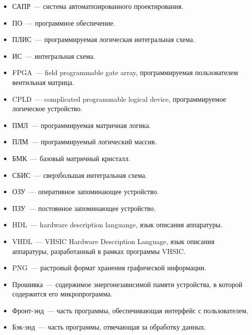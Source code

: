 \begin{itemize}[label=]
  \item САПР~--- система автоматизированного проектирования.
  \item ПО~--- программное обеспечение.
  \item ПЛИС~--- программируемая логическая интегральная схема.
  \item ИС~--- интегральная схема.
  \item FPGA~--- field programmable gate array, программируемая пользователем вентильная матрица.
  \item CPLD~--- complicated programmable logical device, программируемое логическое устройство.
  \item ПМЛ~--- программируемая матричная логика.
  \item ПЛМ~--- программируемый логический массив.
  \item БМК~--- базовый матричный кристалл.
  \item СБИС~--- сверхбольшая интегральная схема.
  \item ОЗУ~--- оперативное запоминающее устройство.
  \item ПЗУ~--- постоянное запоминающее устройство.
  \item HDL~--- hardware description languange, язык описания аппаратуры.
  \item VHDL~--- VHSIC Hardware Description Language, язык описания аппаратуры, разработанный в рамках программы VHSIC.
  \item PNG~---  растровый формат хранения графической информации.
  \item Прошивка~--- содержимое энергонезависимой памяти устройства, в которой содержится его микропрограмма.
  \item Фронт-энд~--- часть программы, обеспечивающая интерфейс с пользователем.
  \item Бэк-энд~--- часть программы, отвечающая за обработку данных.
\end{itemize}